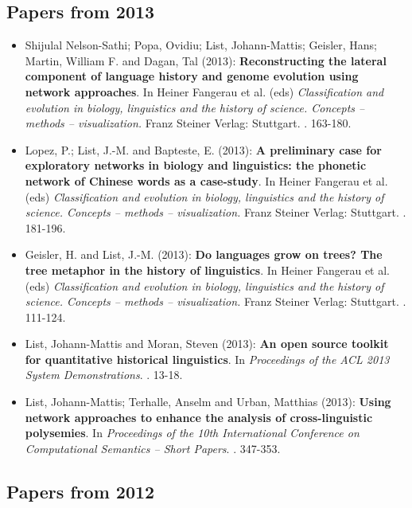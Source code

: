 \subsection{Papers from 2013}
 
\begin{itemize}
\item[] Shijulal Nelson-Sathi; Popa, Ovidiu; List, Johann-Mattis; Geisler, Hans; Martin, William F. and Dagan, Tal (2013): \textbf{Reconstructing the lateral component of language history and genome evolution using network approaches}. In Heiner Fangerau et al. (eds)  \textit{Classification and evolution in biology, linguistics and the history of science. Concepts – methods – visualization.} Franz Steiner Verlag: Stuttgart. . 163-180.

\item[] Lopez, P.; List, J.-M. and Bapteste, E. (2013): \textbf{A preliminary case for exploratory networks in biology and linguistics: the phonetic network of Chinese words as a case-study}. In Heiner Fangerau et al. (eds)  \textit{Classification and evolution in biology, linguistics and the history of science. Concepts – methods – visualization.} Franz Steiner Verlag: Stuttgart. . 181-196.

\item[] Geisler, H. and List, J.-M. (2013): \textbf{Do languages grow on trees? The tree metaphor in the history of linguistics}. In Heiner Fangerau et al. (eds)  \textit{Classification and evolution in biology, linguistics and the history of science. Concepts – methods – visualization.} Franz Steiner Verlag: Stuttgart. . 111-124.

\item[] List, Johann-Mattis and Moran, Steven (2013): \textbf{An open source toolkit for quantitative historical linguistics}. In \textit{Proceedings of the ACL 2013 System Demonstrations}. . 13-18.

\item[] List, Johann-Mattis; Terhalle, Anselm and Urban, Matthias (2013): \textbf{Using network approaches to enhance the analysis of cross-linguistic polysemies}. In \textit{Proceedings of the 10th International Conference on Computational Semantics -- Short Papers}. . 347-353.

\end{itemize}
\subsection{Papers from 2012}
 
